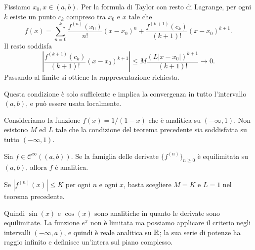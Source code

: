 \documentclass[a4paper]{article}
\begin{document}
\begin{radioactive}
\begin{snippetproof}{}
    Fissiamo \(x_0,x\in(a,b)\). Per la formula di Taylor con resto di Lagrange,
    per ogni \(k\) esiste un punto \(c_k\) compreso tra \(x_0\) e \(x\) tale che
    \[
        f(x)=\sum_{n=0}^{k}\frac{f^{(n)}(x_0)}{n!}(x-x_0)^n
        +\frac{f^{(k+1)}(c_k)}{(k+1)!}(x-x_0)^{k+1}.
    \]
    Il resto soddisfa
    \[
        \left|\frac{f^{(k+1)}(c_k)}{(k+1)!}(x-x_0)^{k+1}\right|
        \leq M\frac{(L|x-x_0|)^{k+1}}{(k+1)!}\longrightarrow0.
    \]
    Passando al limite si ottiene la rappresentazione richiesta.
\end{snippetproof}
\end{radioactive}

\begin{radioactive}
Questa condizione è solo sufficiente e implica la convergenza in tutto l'intervallo \((a,b)\),
e può essere usata localmente.
\end{radioactive}

\begin{radioactive}
\begin{snippetexample}{}
    Consideriamo la funzione \(f(x) = 1 / (1-x)\)
    che è analitica su \((-\infty, 1)\).
    Non esistono \(M\) ed \(L\) tale che
    la condizione del teorema precedente
    sia soddisfatta su tutto \((-\infty, 1)\).
\end{snippetexample}
\end{radioactive}

\begin{radioactive}
\begin{snippetproposition}{}
    Sia \(f\in\mathcal C^\infty((a,b))\). Se la famiglia delle derivate
    \(\{f^{(n)}\}_{n\geq0}\) è equilimitata su \((a,b)\), allora \(f\) è analitica.
\end{snippetproposition}
\end{radioactive}

\begin{radioactive}
\begin{snippetproof}{}
    Se \(|f^{(n)}(x)|\leq K\) per ogni \(n\) e ogni \(x\), basta scegliere
    \(M=K\) e \(L=1\)
    nel teorema precedente.
\end{snippetproof}
\end{radioactive}

\begin{radioactive}
Quindi \(\sin(x)\) e \(\cos(x)\) sono analitiche in quanto le derivate sono equilimitate.
La funzione \(e^x\) non è limitata ma possiamo applicare il criterio negli intervalli
\((-\infty, a)\), e quindi è reale analitica su \(\mathbb{R}\); la sua serie di potenze ha raggio infinito e definisce un'intera sul piano complesso.

\end{radioactive}
\end{document}
